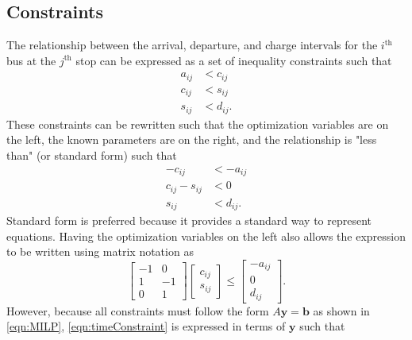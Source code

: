 \subsection{Constraints}
The relationship between the arrival, departure, and charge intervals for the $i^{\text{th}}$ bus at the $j^{\text{th}}$ stop can be expressed as a set of inequality constraints such that
\begin{equation}\begin{aligned}
	a_{ij} &< c_{ij} \\
	c_{ij} &< s_{ij} \\
	s_{ij} &< d_{ij}.
\end{aligned}\end{equation}
These constraints can be rewritten such that the optimization variables are on the left, the known parameters are on the right, and the relationship is "less than" (or standard form) such that
\begin{equation}\begin{aligned}
	-c_{ij} &< -a_{ij}\\
	c_{ij} - s_{ij} &< 0\\
	s_{ij} &< d_{ij}.
\end{aligned}\end{equation}
Standard form is preferred because it provides a standard way to represent equations. Having the optimization variables on the left also allows the expression to be written using matrix notation as 
\begin{equation}\label{eqn:timeConstraint}
	\begin{bmatrix} -1 & 0 \\
	                 1 & -1 \\
		0 & 1\end{bmatrix} \begin{bmatrix} c_{ij} \\ s_{ij}\end{bmatrix} \le \begin{bmatrix}-a_{ij} \\ 0 \\ d_{ij} \end{bmatrix}.
\end{equation}
	However, because all constraints must follow the form $A\mathbf{y} = \mathbf{b}$ as shown in \eqref{eqn:MILP}, \eqref{eqn:timeConstraint} is expressed in terms of $\mathbf{y}$ such that
